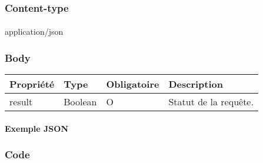 	\subsubsection{Content-type}
		\paragraph{}
			application/json
	
	\subsubsection{Body}
		\begin{center}
			\begin{tabularx}{\textwidth}{| T{0.2122\textwidth} | S{0.22\textwidth} | S{0.15\textwidth} | S{0.3\textwidth} |}
				\hline
				Propriété & Type & Obligatoire & Description \\
				\hline
				result & Boolean & O & Statut de la requête. \\
				\hline
			\end{tabularx}
		\end{center}
		
		\paragraph{Exemple JSON}
			\paragraph{}
			
			
	\subsubsection{Code}
		\paragraph{}
